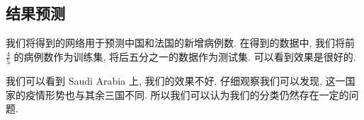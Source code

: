 \documentclass[UTF8]{ctexart}
\begin{document}
	\subsection*{结果预测}
	我们将得到的网络用于预测中国和法国的新增病例数. 在得到的数据中, 我们将前 $\frac{4}{5}$ 的病例数作为训练集, 将后五分之一的数据作为测试集. 可以看到效果是很好的.
	\begin{figure}[htbp]
	    \centering
	\end{figure}
    我们可以看到 Saudi Arabia 上, 我们的效果不好. 仔细观察我们可以发现, 这一国家的疫情形势也与其余三国不同. 所以我们可以认为我们的分类仍然存在一定的问题.
\end{document}
